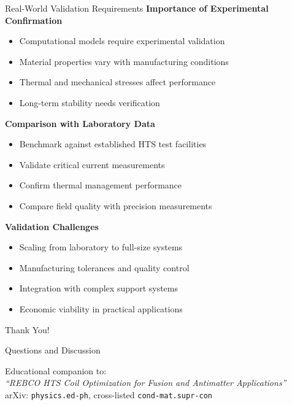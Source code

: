 \begin{frame}{Real-World Validation Requirements}
    \textbf{Importance of Experimental Confirmation}
    \begin{itemize}
        \item Computational models require experimental validation
        \item Material properties vary with manufacturing conditions
        \item Thermal and mechanical stresses affect performance
        \item Long-term stability needs verification
    \end{itemize}
    
    \vspace{0.5cm}
    \textbf{Comparison with Laboratory Data}
    \begin{itemize}
        \item Benchmark against established HTS test facilities
        \item Validate critical current measurements
        \item Confirm thermal management performance
        \item Compare field quality with precision measurements
    \end{itemize}
    
    \vspace{0.5cm}
    \textbf{Validation Challenges}
    \begin{itemize}
        \item Scaling from laboratory to full-size systems
        \item Manufacturing tolerances and quality control
        \item Integration with complex support systems
        \item Economic viability in practical applications
    \end{itemize}
\end{frame}

\begin{frame}
    \begin{center}
        \Huge Thank You!
        
        \vspace{1cm}
        \Large Questions and Discussion
        
        \vspace{1cm}
        \normalsize
        Educational companion to:\\
        \textit{``REBCO HTS Coil Optimization for Fusion and Antimatter Applications''}\\
        \vspace{0.3cm}
        arXiv: \texttt{physics.ed-ph}, cross-listed \texttt{cond-mat.supr-con}
    \end{center}
\end{frame}

